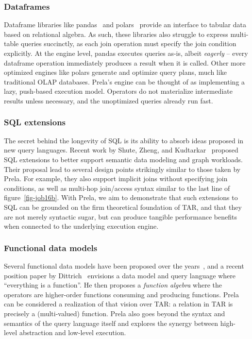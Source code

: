 \documentclass[sigconf,screen,pbalance]{cidr-2027}
\newcommand{\noun}[1]{\textsf{#1}}
\begin{document}
\subsubsection*{Dataframes}
Dataframe libraries like \noun{pandas}~\cite{mckinney2010pandas} and \noun{polars}~\cite{polars} provide an interface to tabular data based on relational algebra.
As such, these libraries also struggle to express multi-table queries succinctly, as each join operation must specify the join condition explicitly.
At the engine level, \noun{pandas} executes queries as-is, albeit \emph{eagerly} -- every dataframe operation immediately produces a result when it is called.
Other more optimized engines like \noun{polars} generate and optimize query plans, much like traditional OLAP databases.
Prela's engine can be thought of as implementing a lazy, push-based execution model.
Operators do not materialize intermediate results unless necessary, and the unoptimized queries already run fast.

\subsubsection*{SQL extensions}
The secret behind the longevity of SQL is its ability to absorb ideas proposed in new query languages.
Recent work by Shute, Zheng, and Kudtarkar~\cite{DBLP:conf/cidr/ShuteZK26} proposed SQL extensions to better support semantic data modeling and graph workloads.
Their proposal lead to several design points strikingly similar to those taken by Prela.
For example, they also support implicit joins without specifying join conditions, as well as multi-hop join/access syntax similar to the last line of figure~\ref{fig-job16b}.
With Prela, we aim to demonstrate that such extensions to SQL can be grounded on the firm theoretical foundation of \noun{TAR}, and that they are not merely syntactic sugar, but can produce tangible performance benefits when connected to the underlying execution engine.

\subsubsection*{Functional data models}
Several functional data models have been proposed over the years~\cite{DBLP:conf/sigmod/BunemanF79,Gray2005FunctionalApproach,DBLP:journals/cj/KulkarniA86,DBLP:conf/sigmod/Shipman79}, and a recent position paper by Dittrich~\cite{DBLP:conf/edbt/Dittrich26} envisions a data model and query language where ``everything is a function''.
He then proposes a \emph{function algebra} where the operators are higher-order functions consuming and producing functions.
Prela can be considered a realization of that vision over \noun{TAR}: a relation in \noun{TAR} is precisely a (multi-valued) function.
Prela also goes beyond the syntax and semantics of the query language itself and explores the synergy between high-level abstraction and low-level execution.
\end{document}
